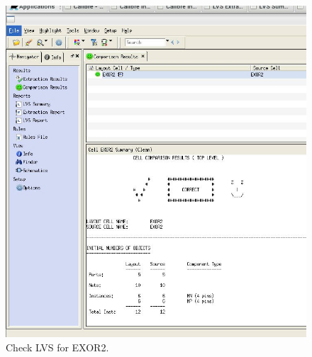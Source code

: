 \begin{figure}[H]
	\centering
	\includegraphics[width=.7\linewidth]{section/EX1/EXOR/EX1_EXOR2_LVS_check.png}
	\caption{Check LVS for EXOR2.}
	\label{f_EX1_EXOR_LVS_check}
\end{figure}